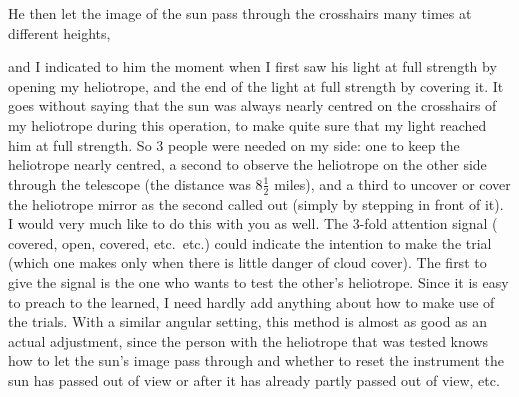 He then let the image of the sun pass through the crosshairs many times at different heights,
\par\vspace{.7cm}
{\centering
{}\par}
\vspace{.7cm}\noindent and I indicated to him the moment when I first saw his light at full strength by opening my heliotrope, and the end of the light at full strength by covering it.
It goes without saying that the sun was always nearly centred on the crosshairs of my heliotrope during this operation, to make quite sure that my light reached him at full strength.
So 3 people were needed on my side: one to keep the heliotrope nearly centred, a second to observe the heliotrope on the other side through the telescope (the distance was \(8\frac{1}{2}\) miles), and a third to uncover or cover the heliotrope mirror as the second called out (simply by stepping in front of it).
I would very much like to do this with you as well.
The 3-fold attention signal ( covered,  open,  covered, etc.\ etc.) could indicate the intention to make the trial (which one makes only when there is little danger of cloud cover). The first to give the signal is the one who wants to test the other's heliotrope.
Since it is easy to preach to the learned, I need hardly add anything about how to make use of the trials.
With a similar angular setting, this method is almost as good as an actual adjustment, since the person with the heliotrope that was tested knows how to let the sun's image pass through and whether to reset the instrument  the sun has passed out of view or after it has already partly passed out of view, etc.
